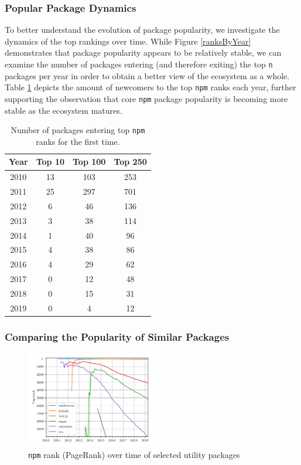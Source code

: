 \documentclass[10pt,conference]{IEEEtran}
\def\code#1{\texttt{#1}}
\begin{document}
\subsubsection{Popular Package Dynamics}

To better understand the evolution of package popularity,
we investigate the dynamics of the top rankings over time.
While Figure \ref{ranksByYear} demonstrates that package popularity
appears to be relatively stable, we can examine the number of packages
entering (and therefore exiting) the top \code{n} packages per year in
order to obtain a better view of the ecosystem as a whole.
Table \ref{numEnteringTop} depicts the amount of newcomers to the top
\code{npm} ranks each year, further supporting the observation that
core \code{npm} package popularity is becoming more stable as the 
ecosystem matures.

\begin{table}
  \centering
  \begin{tabular}{c|c|c|c}
    Year & Top 10 & Top 100 & Top 250 \\
    \hline
    2010 & 13 & 103 & 253\\
    2011 & 25 & 297 & 701\\
    2012 & 6 & 46 & 136\\
    2013 & 3 & 38 & 114\\
    2014 & 1 & 40 & 96\\
    2015 & 4 & 38 & 86\\
    2016 & 4 & 29 & 62\\
    2017 & 0 & 12 & 48\\
    2018 & 0 & 15 & 31\\
    2019 & 0 & 4 & 12\\
  \end{tabular}
  \caption{Number of packages entering top \code{npm} ranks for the first time.}
  \label{numEnteringTop}
\end{table}


\subsubsection{Comparing the Popularity of Similar Packages}

\begin{figure}
  \includegraphics[width=0.5\textwidth]{figures/select_packages.png}
  \caption{\code{npm} rank (PageRank) over time of selected utility packages}
  \label{selectPackages}
\end{figure}
\end{document}

